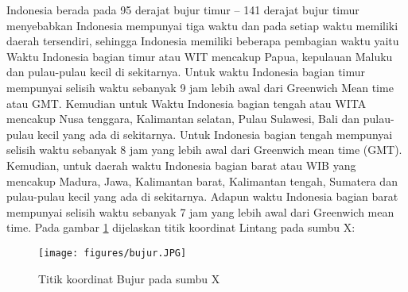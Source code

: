 Indonesia berada pada 95 derajat bujur timur – 141 derajat bujur timur menyebabkan Indonesia mempunyai tiga waktu dan pada setiap waktu memiliki daerah tersendiri, sehingga Indonesia memiliki beberapa pembagian waktu yaitu Waktu Indonesia bagian timur atau WIT mencakup Papua, kepulauan Maluku dan pulau-pulau kecil di sekitarnya. Untuk waktu Indonesia bagian timur mempunyai selisih waktu sebanyak 9 jam lebih awal dari Greenwich Mean time atau GMT. Kemudian untuk Waktu Indonesia bagian tengah atau WITA mencakup Nusa tenggara, Kalimantan selatan, Pulau Sulawesi, Bali dan pulau-pulau kecil yang ada di sekitarnya. Untuk Indonesia bagian tengah mempunyai selisih waktu sebanyak 8 jam yang lebih awal dari Greenwich mean time (GMT). Kemudian, untuk daerah waktu Indonesia bagian barat atau WIB yang mencakup Madura, Jawa, Kalimantan barat, Kalimantan tengah, Sumatera dan pulau-pulau kecil yang ada di sekitarnya. Adapun waktu Indonesia bagian barat mempunyai selisih waktu sebanyak 7 jam yang lebih awal dari Greenwich mean time.
Pada gambar \ref{bujur} dijelaskan titik koordinat Lintang pada sumbu X:
\begin{figure}[ht]
	\centerline{\texttt{[image: figures/bujur.JPG]}}
	\caption{Titik koordinat Bujur pada sumbu X}
	\label{bujur}
	\end{figure}
